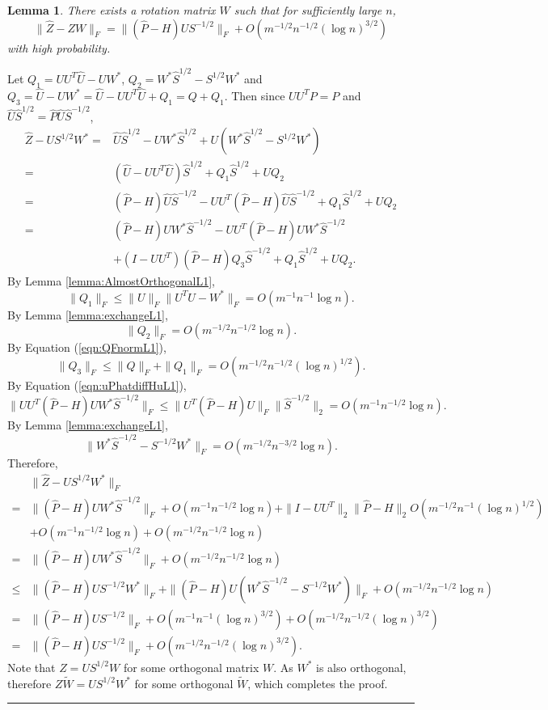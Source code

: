 \documentclass[a4paper]{article}
\newenvironment{proof}{{\bf Proof:  }}{\hfill\rule{2mm}{2mm}}
\newtheorem{lemma}[fact]{Lemma}
\begin{document}
\begin{lemma}
\label{lemma:XhatDiffXWexpressionL1}
There exists a rotation matrix $W$ such that for sufficiently large $n$,
\[
	\|\hat{Z} - Z W\|_F = \| (\hat{P} - H) U S^{-1/2} \|_F + O(m^{-1/2} n^{-1/2} (\log n)^{3/2})
\]
with high probability.
\end{lemma}
\begin{proof}
Let $Q_1 = U U^T \hat{U} - U W^*$, $Q_2 = W^* \hat{S}^{1/2} - S^{1/2} W^*$ and $Q_3 = \hat{U} - U W^* = \hat{U} - U U^T \hat{U} + Q_1 = Q + Q_1$. Then since $U U^T P = P$ and $\hat{U} \hat{S}^{1/2} = \hat{P} \hat{U} \hat{S}^{-1/2}$,
\begin{align*}
	\hat{Z} - U S^{1/2} W^*
    = & \hat{U} \hat{S}^{1/2} - U W^* \hat{S}^{1/2} + U(W^* \hat{S}^{1/2} - S^{1/2} W^*) \\
    = & (\hat{U} - U U^T \hat{U}) \hat{S}^{1/2} + Q_1 \hat{S}^{1/2} + U Q_2 \\
    = & (\hat{P} - H) \hat{U} \hat{S}^{-1/2} - U U^T(\hat{P} - H)\hat{U}\hat{S}^{-1/2} + Q_1 \hat{S}^{1/2} + U Q_2 \\
    = & (\hat{P} - H) U W^* \hat{S}^{-1/2} - U U^T(\hat{P} - H)U W^*\hat{S}^{-1/2} \\
    & + (I - U U^T)(\hat{P} - H) Q_3 \hat{S}^{-1/2} + Q_1 \hat{S}^{1/2} + U Q_2.
\end{align*}
By Lemma \ref{lemma:AlmostOrthogonalL1},
\[
	\|Q_1\|_F \le \| U\|_F \| U^T \hat{U} - W^* \|_F = O(m^{-1} n^{-1} \log n).
\]
By Lemma \ref{lemma:exchangeL1},
\[
	\|Q_2\|_F = O(m^{-1/2} n^{-1/2} \log n).
\]
By Equation (\ref{eqn:QFnormL1}),
\[
	\|Q_3\|_F \le \|Q\|_F + \|Q_1\|_F = O(m^{-1/2} n^{-1/2} (\log n)^{1/2}).
\]
By Equation (\ref{eqn:uPhatdiffHuL1}),
\[
	\| U U^T(\hat{P} - H)U W^*\hat{S}^{-1/2} \|_F
    \le \| U^T(\hat{P} - H)U \|_F \| \hat{S}^{-1/2} \|_2
    = O(m^{-1} n^{-1/2} \log n).
\]
By Lemma \ref{lemma:exchangeL1},
\[
	\| W^* \hat{S}^{-1/2} - S^{-1/2} W^* \|_F = O(m^{-1/2} n^{-3/2} \log n).
\]
Therefore,
\begin{align*}
	& \| \hat{Z} - U S^{1/2} W^* \|_F \\
    = & \| (\hat{P} - H) U W^* \hat{S}^{-1/2} \|_F + O(m^{-1} n^{-1/2} \log n)
    + \|I - U U^T \|_2 \| \hat{P} - H \|_2 O(m^{-1/2} n^{-1} (\log n)^{1/2}) \\
    & + O(m^{-1} n^{-1/2} \log n) + O(m^{-1/2} n^{-1/2} \log n)\\
    = & \| (\hat{P} - H) U W^* \hat{S}^{-1/2} \|_F + O(m^{-1/2} n^{-1/2} \log n) \\
    \le & \| (\hat{P} - H) U S^{-1/2} W^* \|_F + \|(\hat{P} - H) U (W^* \hat{S}^{-1/2} - S^{-1/2} W^*) \|_F + O(m^{-1/2} n^{-1/2} \log n) \\
    = & \| (\hat{P} - H) U S^{-1/2}\|_F + O(m^{-1} n^{-1} (\log n)^{3/2}) + O(m^{-1/2} n^{-1/2} (\log n)^{3/2}) \\
    = & \| (\hat{P} - H) U S^{-1/2}\|_F + O(m^{-1/2} n^{-1/2} (\log n)^{3/2}).
\end{align*}
Note that $Z = U S^{1/2} W$ for some orthogonal matrix $W$. As $W^*$ is also orthogonal, therefore $Z \tilde{W} = U S^{1/2} W^*$ for some orthogonal $\tilde{W}$, which completes the proof.
\end{proof}
\end{document}

